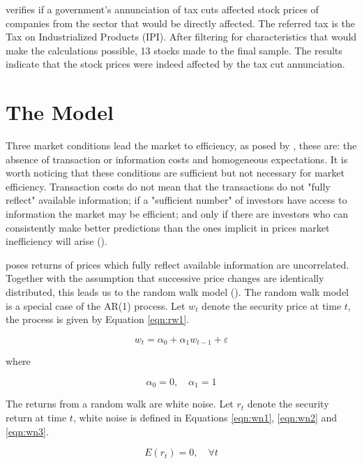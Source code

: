 \documentclass[cic,tc, english]{iiufrgs}
\begin{document}
    \citet{gabrielribeiro2013} verifies if a government's annunciation of tax cuts affected stock prices of companies from the sector that would be directly affected. The referred tax is the Tax on Industrialized Products (IPI). After filtering for characteristics that would make the calculations possible, 13 stocks made to the final sample. The results indicate that the stock prices were indeed affected by the tax cut annunciation.

\chapter{The Model} \label{chapter_model}

    Three market conditions lead the market to efficiency, as posed by \citet{fama1970}, these are: the absence of transaction or information costs and homogeneous expectations. It is worth noticing that these conditions are sufficient but not necessary for market efficiency. Transaction costs do not mean that the transactions do not "fully reflect" available information; if a "sufficient number" of investors have access to information the market may be efficient; and only if there are investors who can consistently make better predictions than the ones implicit in prices market inefficiency will arise (\citet{fama1970}).
    
    \citet{samuelson1965} poses returns of prices which fully reflect available information are uncorrelated. Together with the assumption that successive price changes are identically distributed, this leads us to the random walk model (\citet{fama1970}). The random walk model is a special case of the AR(1) process. Let $w_t$ denote the security price at time $t$, the process is given by Equation \ref{eqn:rw1}.
    
    \begin{equation}
        \label{eqn:rw1}
        w_t = \alpha_0 + \alpha_1 w_{t-1} + \varepsilon
    \end{equation}

    where

    $$\alpha_0 = 0, \quad \alpha_1 = 1$$

    The returns from a random walk are white noise. Let $r_{t}$ denote the security return at time $t$, white noise is defined in Equations \ref{eqn:wn1}, \ref{eqn:wn2} and \ref{eqn:wn3}.
    
    \begin{equation}
        \label{eqn:wn1}
        E(r_t) = 0, \quad \forall t
    \end{equation}
    
\end{document}
